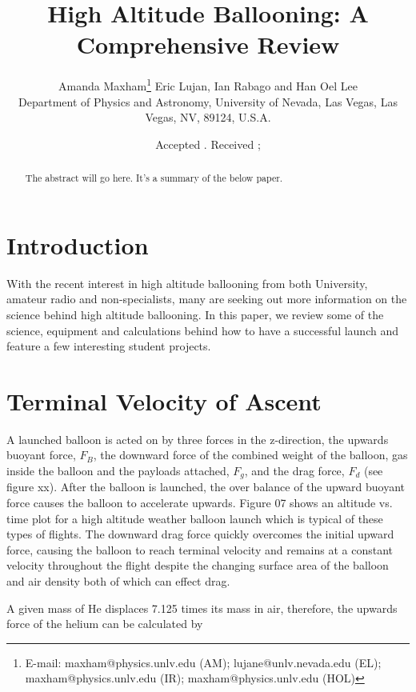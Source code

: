 \documentclass[useAMS,usenatbib]{mn2e}
\title[]{High Altitude Ballooning: A Comprehensive Review}
\author[Amanda Maxham, etc.]{Amanda Maxham\thanks{E-mail:
maxham@physics.unlv.edu (AM); lujane@unlv.nevada.edu (EL); maxham@physics.unlv.edu (IR); maxham@physics.unlv.edu (HOL) } Eric Lujan, Ian Rabago and Han Oel Lee\\
Department of Physics and Astronomy, University of Nevada, Las Vegas, Las Vegas, NV, 89124, U.S.A.}
\begin{document}
\date{Accepted . Received ; }

\pagerange{\pageref{firstpage}--\pageref{lastpage}} 

\maketitle

\label{firstpage}

\begin{abstract}
The abstract will go here. It's a summary of the below paper.
\end{abstract}

\section{Introduction}
With the recent interest in high altitude ballooning from both University, amateur radio and non-specialists, many are seeking out more information on the science behind high altitude ballooning. In this paper, we review some of the science, equipment and calculations behind how to have a successful launch and feature a few interesting student projects.

\section[]{Terminal Velocity of Ascent}
A launched balloon is acted on by three forces in the z-direction, the upwards buoyant force, $F_{B}$,  %
the downward force of the combined weight of the balloon, gas inside the balloon and the payloads attached, $F_g$, and the drag force, $F_d$ (see figure xx).  After the balloon is launched, the over balance of the upward buoyant force causes the balloon to accelerate upwards. Figure 07 shows an altitude vs. time plot for a high altitude weather balloon launch which is typical of these types of flights. The downward drag force quickly overcomes the initial upward force, causing the balloon to reach terminal velocity and remains at a constant velocity throughout the flight despite the changing surface area of the balloon and air density both of which can effect drag.


 A given mass of He displaces 7.125 times its mass in air, therefore, the upwards force of the helium can be calculated by 
\end{document}
